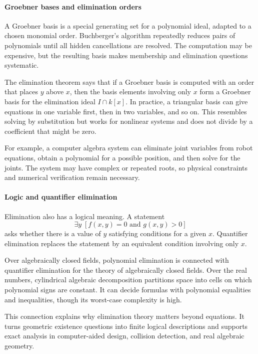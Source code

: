 \paragraph{Groebner bases and elimination orders}

A Groebner basis is a special generating set for a polynomial ideal, adapted to a chosen monomial order. Buchberger's algorithm repeatedly reduces pairs of polynomials until all hidden cancellations are resolved. The computation may be expensive, but the resulting basis makes membership and elimination questions systematic.

The elimination theorem says that if a Groebner basis is computed with an order that places $y$ above $x$, then the basis elements involving only $x$ form a Groebner basis for the elimination ideal $I\cap k[x]$. In practice, a triangular basis can give equations in one variable first, then in two variables, and so on. This resembles solving by substitution but works for nonlinear systems and does not divide by a coefficient that might be zero.

For example, a computer algebra system can eliminate joint variables from robot equations, obtain a polynomial for a possible position, and then solve for the joints. The system may have complex or repeated roots, so physical constraints and numerical verification remain necessary. \cite{elimination_theory_ref1,elimination_theory_ref5}

\paragraph{Logic and quantifier elimination}

Elimination also has a logical meaning. A statement
\[
 \exists y\;[f(x,y)=0\text{ and }g(x,y)>0]
\]
asks whether there is a value of $y$ satisfying conditions for a given $x$. Quantifier elimination replaces the statement by an equivalent condition involving only $x$.

Over algebraically closed fields, polynomial elimination is connected with quantifier elimination for the theory of algebraically closed fields. Over the real numbers, cylindrical algebraic decomposition partitions space into cells on which polynomial signs are constant. It can decide formulas with polynomial equalities and inequalities, though its worst-case complexity is high.

This connection explains why elimination theory matters beyond equations. It turns geometric existence questions into finite logical descriptions and supports exact analysis in computer-aided design, collision detection, and real algebraic geometry. \cite{elimination_theory_ref6}

